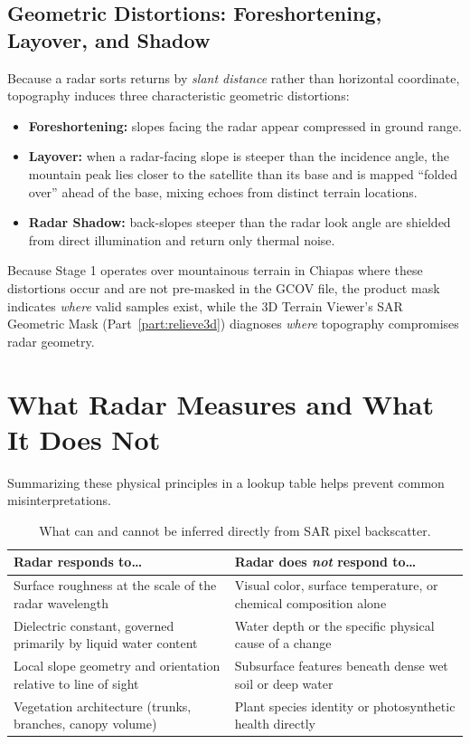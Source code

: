\documentclass[11pt,a4paper]{article}
\begin{document}
\subsection{Geometric Distortions: Foreshortening, Layover, and Shadow}

Because a radar sorts returns by \emph{slant distance} rather than horizontal coordinate, topography induces three characteristic geometric distortions:
\begin{itemize}
  \item \textbf{Foreshortening:} slopes facing the radar appear compressed in ground range.
  \item \textbf{Layover:} when a radar-facing slope is steeper than the incidence angle, the mountain peak lies closer to the satellite than its base and is mapped ``folded over'' ahead of the base, mixing echoes from distinct terrain locations.
  \item \textbf{Radar Shadow:} back-slopes steeper than the radar look angle are shielded from direct illumination and return only thermal noise.
\end{itemize}
Because Stage 1 operates over mountainous terrain in Chiapas where these distortions occur and are not pre-masked in the GCOV file, the product mask indicates \emph{where} valid samples exist, while the 3D Terrain Viewer's SAR Geometric Mask (Part~\ref{part:relieve3d}) diagnoses \emph{where} topography compromises radar geometry.

\section{What Radar Measures and What It Does Not}
\label{sec:mide-no-mide}

Summarizing these physical principles in a lookup table helps prevent common misinterpretations.

\begin{table}[htbp]
\centering\small
\begin{tabularx}{\linewidth}{p{.3\linewidth}X}
\toprule
\textbf{Radar responds to\ldots} & \textbf{Radar does \emph{not} respond to\ldots}\\\midrule
Surface roughness at the scale of the radar wavelength & Visual color, surface temperature, or chemical composition alone\\
Dielectric constant, governed primarily by liquid water content & Water depth or the specific physical cause of a change\\
Local slope geometry and orientation relative to line of sight & Subsurface features beneath dense wet soil or deep water\\
Vegetation architecture (trunks, branches, canopy volume) & Plant species identity or photosynthetic health directly\\\bottomrule
\end{tabularx}
\caption{What can and cannot be inferred directly from SAR pixel backscatter.}
\label{tab:mide-no-mide}
\end{table}
\end{document}
